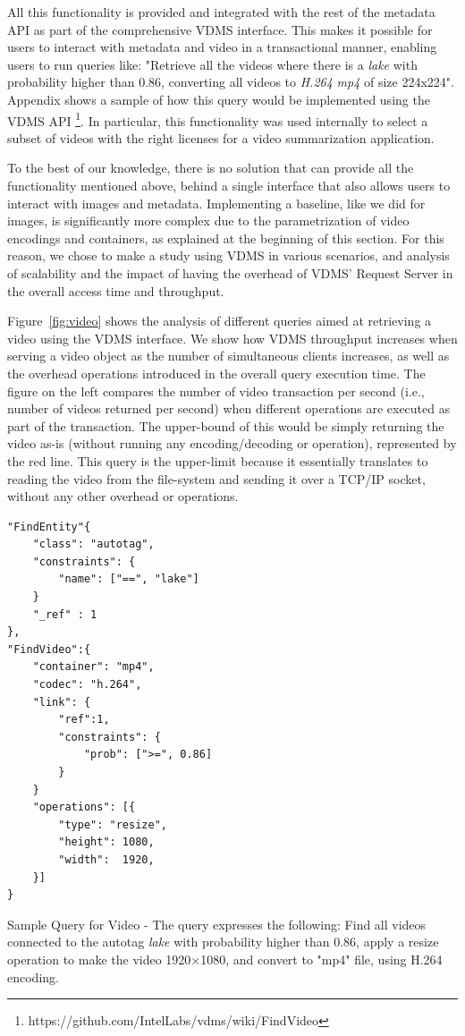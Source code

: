 All this functionality is provided and integrated with the rest of the
metadata API as part of the comprehensive VDMS interface.
This makes it possible for users to interact with metadata and video in
a transactional manner, enabling users to run queries like:
"Retrieve all the videos where there is a \textit{lake} with
probability higher than 0.86, converting all videos to \textit{H.264}
\textit{mp4} of size 224x224".
Appendix shows a sample of how this query would be implemented using the VDMS API
\footnote{https://github.com/IntelLabs/vdms/wiki/FindVideo}.
In particular, this functionality was used internally to select a subset
of videos with the right licenses for a video summarization application.

To the best of our knowledge, there is no solution that can provide
all the functionality mentioned above, behind a single interface
that also allows users to interact with images and metadata.
Implementing a baseline, like we did for images, is significantly more complex
due to the parametrization of video encodings and containers,
as explained at the beginning of this section.
For this reason, we chose to make a study using VDMS in various scenarios,
and analysis of scalability and the impact of having the overhead of VDMS' Request
Server in the overall access time and throughput.

Figure~\ref{fig:video} shows the analysis of different queries aimed
at retrieving a video using the VDMS interface.
We show how VDMS throughput increases when serving
a video object as the number of simultaneous clients increases, as well as the
overhead operations introduced in the overall query execution time.
The figure on the left compares the number of video transaction per second
(i.e., number of videos returned per second) when different operations
are executed as part of the transaction. The upper-bound of this would be
simply returning the video as-is (without running any encoding/decoding or
operation), represented by the red line. This query is the upper-limit because
it essentially translates to reading the video from the file-system and sending
it over a TCP/IP socket, without any other overhead or operations.

\begin{listing}[ht!]
\begin{verbatim}
"FindEntity"{
    "class": "autotag",
    "constraints": {
        "name": ["==", "lake"]
    }
    "_ref" : 1
},
"FindVideo":{
    "container": "mp4",
    "codec": "h.264",
    "link": {
        "ref":1,
        "constraints": {
            "prob": [">=", 0.86]
        }
    }
    "operations": [{
        "type": "resize",
        "height": 1080,
        "width":  1920,
    }]
}

\end{verbatim}
\caption{Sample Query for Video -
The query expresses the following:
Find all videos connected to the autotag \textit{lake}
with probability higher than 0.86, apply a resize operation
to make the video 1920×1080, and convert to "mp4" file,
using H.264 encoding.}
\label{findvideo}
\end{listing}

